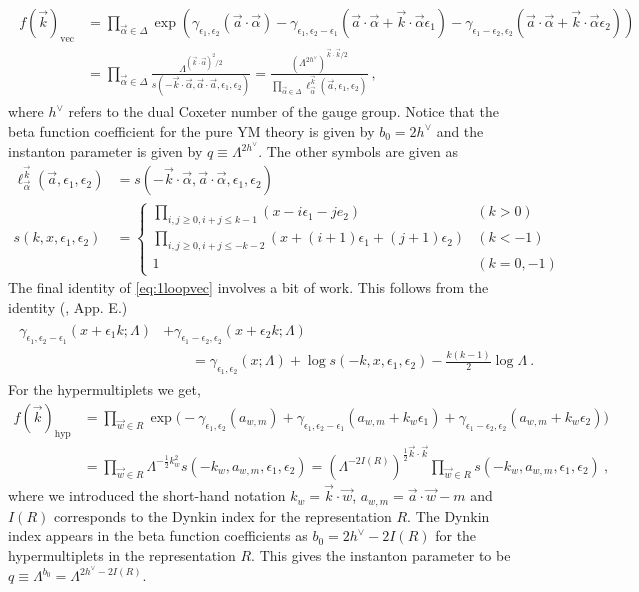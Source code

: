 \documentclass[letterpaper, 11pt]{article}
\newcommand{\nn}{\nonumber}
\def\a{\alpha}
\def\g{\gamma}
\def\e{\epsilon}
\def\half{\frac{1}{2}}
\begin{document}
\begin{align} \label{eq:1loopvec}
\begin{split}
f(\vec{k})_{\textrm{vec}} &= \prod_{\vec{\a} \in \Delta} \exp \left( \g_{\e_1, \e_2} (\vec{a}\cdot \vec{\a}) - \g_{\e_1, \e_2 - \e_1}(\vec{a}\cdot \vec{\a} + \vec{k}\cdot\vec{\a} \e_1) -  \g_{\e_1 - \e_2, \e_2 }(\vec{a}\cdot \vec{\a} +  \vec{k}\cdot\vec{\a} \e_2)   \right) \\
 &= \prod_{\vec{\a} \in \Delta}  \frac{\Lambda^{(\vec{k} \cdot \vec{\a})^2 /2} }{s(-\vec{k}\cdot \vec{\a}, \vec{\a}\cdot \vec{a}, \e_1, \e_2) }
 = \frac{(\Lambda^{2 h^\vee})^{\vec{k} \cdot \vec{k}/2} }{\prod_{\vec{\a} \in \Delta} \ell^{\vec{k}}_{\vec{\a}} (\vec{a}, \e_1, \e_2) } \ , 
\end{split}
\end{align}
where $h^\vee$ refers to the dual Coxeter number of the gauge group. Notice that the beta function coefficient for the pure YM theory is given by $b_0 = 2h^\vee$ and the instanton parameter is given by $q \equiv \Lambda^{2 h^\vee}$. The other symbols are given as 
\begin{align}
\ell^{\vec{k}}_{\vec{\alpha}} (\vec{a}, \e_1, \e_2) &= s(-\vec{k}\cdot\vec{\a}, \vec{a}\cdot\vec{\a}, \e_1, \e_2) \\
s(k, x, \e_1, \e_2) &= 
\begin{cases}
 {\displaystyle \prod_{i, j \ge 0, i+j \le k-1} (x - i \e_1 - j e_2) } & (k > 0) \\
 {\displaystyle \prod_{i, j \ge 0, i+j \le -k-2} (x + (i+1)\e_1 + (j+1)\e_2)} & (k < -1)  \\
 1 & (k=0, -1)
\end{cases}
\end{align}
The final identity of \eqref{eq:1loopvec} involves a bit of work. This follows from the identity (\cite{Nakajima:2003uh}, App. E.)
\begin{align}
\begin{split}
 \g_{\e_1, \e_2-\e_1}(x+\e_1 k; \Lambda) &+ \g_{\e_1 - \e_2, \e_2}(x+\e_2k; \Lambda) \\
  & \qquad = \g_{\e_1, \e_2}(x; \Lambda) + \log s(-k, x, \e_1, \e_2) - \frac{k(k-1)}{2} \log \Lambda \ . 
\end{split}
\end{align}
For the hypermultiplets we get, 
\begin{align}
f(\vec{k})_{\textrm{hyp}} &=  \prod_{\vec{w} \in R} \exp \Big( -\g_{\e_1, \e_2} (a_{w, m}) + \g_{\e_1, \e_2 - \e_1}(a_{w, m} + k_w \e_1) +  \g_{\e_1 - \e_2, \e_2 }(a_{w, m} + k_w \e_2)   \Big) \nn \\
&= \prod_{\vec{w} \in R} \Lambda^{-\half k_w^2} s(-{k}_w, a_{w, m}, \e_1, \e_2) 
= (\Lambda^{- 2 I(R)})^{\half \vec{k} \cdot \vec{k} }\prod_{\vec{w} \in R}  s(-{k}_w, a_{w, m}, \e_1, \e_2) 
\ , 
\end{align}
where we introduced the short-hand notation $k_w = \vec{k}\cdot\vec{w}$, $a_{w, m} = \vec{a} \cdot \vec{w} - m$ and $I(R)$ corresponds to the Dynkin index for the representation $R$. The Dynkin index appears in the beta function coefficients as $b_0 = 2h^\vee - 2 I(R)$ for the hypermultiplets in the representation $R$.  This gives the instanton parameter to be $q \equiv \Lambda^{b_0} = \Lambda^{2h^\vee - 2 I(R)}$. 
\end{document}
